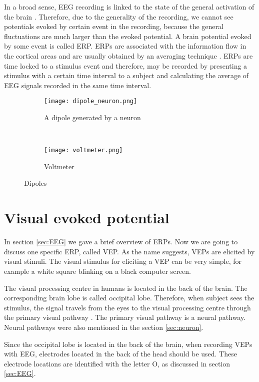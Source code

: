 In a broad sense, \gls{EEG} recording is linked to the state of the general activation of the brain \cite{VEP}. Therefore, due to the generality of the recording, we cannot see potentials evoked by certain event in the recording, because the general fluctuations are much larger than the evoked potential. A brain potential evoked by some event is called \gls{ERP}. \glspl{ERP} are associated with the information flow in the cortical areas and are usually obtained by an averaging technique \cite{ERP}. \glspl{ERP} are time locked to a stimulus event and therefore, may be recorded by presenting a stimulus with a certain time interval to a subject and calculating the average of \gls{EEG} signals recorded in the same time interval.

\begin{figure}[h]
	\centering
	\begin{subfigure}{0.48\textwidth}
		\texttt{[image: dipole\_neuron.png]}
		\caption{A dipole generated by a neuron \cite[p.~669]{neuroscience}}
		\label{fig:dipole_neuron}
	\end{subfigure}
	~
	\begin{subfigure}{0.48\textwidth}
		\texttt{[image: voltmeter.png]}
		\caption{Voltmeter \cite{ERP}}
		\label{fig:voltmeter}
	\end{subfigure}
	\caption{Dipoles}
	\label{fig:asd}
\end{figure}

\section{Visual evoked potential}

In section \ref{sec:EEG} we gave a brief overview of \glspl{ERP}. Now we are going to discuss one specific \gls{ERP}, called \gls{VEP}. As the name suggests, \glspl{VEP} are elicited by visual stimuli. The visual stimulus for eliciting a \gls{VEP} can be very simple, for example a white square blinking on a black computer screen.

The visual processing centre in humans is located in the back of the brain. The corresponding brain lobe is called occipital lobe. Therefore, when subject sees the stimulus, the signal travels from the eyes to the visual processing centre through the primary visual pathway \cite{neuroscience}. The primary visual pathway is a neural pathway. Neural pathways were also mentioned in the section \ref{sec:neuron}.

Since the occipital lobe is located in the back of the brain, when recording \glspl{VEP} with \gls{EEG}, electrodes located in the back of the head should be used. These electrode locations are identified with the letter O, as discussed in section \ref{sec:EEG}.

